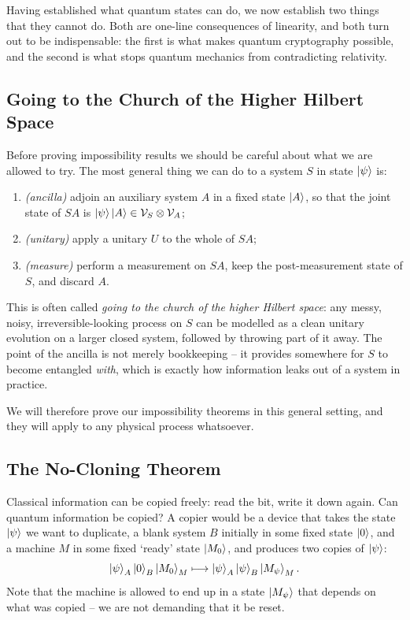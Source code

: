 \documentclass[a4paper]{scrartcl}
\newcommand{\Vs}{\mathcal{V}}
\begin{document}
Having established what quantum states can do, we now establish two things that they cannot do. Both are one-line consequences of linearity, and both turn out to be indispensable: the first is what makes quantum cryptography possible, and the second is what stops quantum mechanics from contradicting relativity.

\subsection{Going to the Church of the Higher Hilbert Space}\label{sec:church}

Before proving impossibility results we should be careful about what we are allowed to try. The most general thing we can do to a system $S$ in state $\ket{\psi}$ is:
\begin{enumerate}[label=(\roman*)]
	\item \emph{(ancilla)} adjoin an auxiliary system $A$ in a fixed state $\ket{A}$, so that the joint state of $SA$ is $\ket{\psi}\ket{A} \in \Vs_S \otimes \Vs_A$;
	\item \emph{(unitary)} apply a unitary $U$ to the whole of $SA$;
	\item \emph{(measure)} perform a measurement on $SA$, keep the post-measurement state of $S$, and discard $A$.
\end{enumerate}
This is often called \emph{going to the church of the higher Hilbert space}: any messy, noisy, irreversible-looking process on $S$ can be modelled as a clean unitary evolution on a larger closed system, followed by throwing part of it away. The point of the ancilla is not merely bookkeeping -- it provides somewhere for $S$ to become entangled \emph{with}, which is exactly how information leaks out of a system in practice.

We will therefore prove our impossibility theorems in this general setting, and they will apply to any physical process whatsoever.

\subsection{The No-Cloning Theorem}\label{sec:nocloning}

Classical information can be copied freely: read the bit, write it down again. Can quantum information be copied? A copier would be a device that takes the state $\ket{\psi}$ we want to duplicate, a blank system $B$ initially in some fixed state $\ket{0}$, and a machine $M$ in some fixed `ready' state $\ket{M_0}$, and produces two copies of $\ket{\psi}$:
$$\ket{\psi}_A\ket{0}_B\ket{M_0}_M \longmapsto \ket{\psi}_A\ket{\psi}_B\ket{M_\psi}_M.$$
Note that the machine is allowed to end up in a state $\ket{M_\psi}$ that depends on what was copied -- we are not demanding that it be reset.
\end{document}
